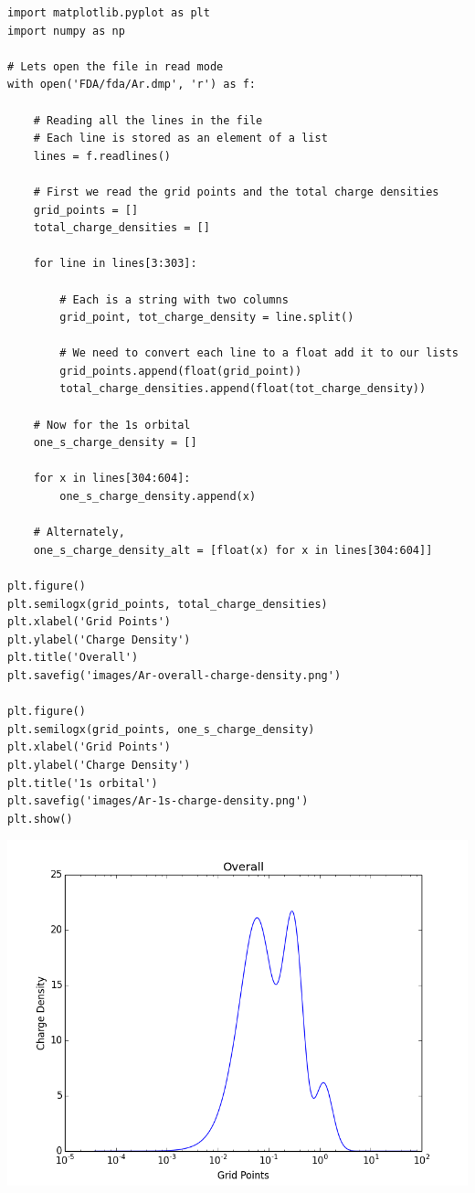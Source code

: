 \documentclass[11pt]{article}
\begin{document}
\begin{verbatim}
import matplotlib.pyplot as plt
import numpy as np

# Lets open the file in read mode
with open('FDA/fda/Ar.dmp', 'r') as f:

    # Reading all the lines in the file
    # Each line is stored as an element of a list
    lines = f.readlines()

    # First we read the grid points and the total charge densities
    grid_points = []
    total_charge_densities = []

    for line in lines[3:303]:

        # Each is a string with two columns
        grid_point, tot_charge_density = line.split()

        # We need to convert each line to a float add it to our lists
        grid_points.append(float(grid_point))
        total_charge_densities.append(float(tot_charge_density))
    
    # Now for the 1s orbital
    one_s_charge_density = []
    
    for x in lines[304:604]:
        one_s_charge_density.append(x)
 
    # Alternately,
    one_s_charge_density_alt = [float(x) for x in lines[304:604]]

plt.figure()
plt.semilogx(grid_points, total_charge_densities)
plt.xlabel('Grid Points')
plt.ylabel('Charge Density')
plt.title('Overall')
plt.savefig('images/Ar-overall-charge-density.png')

plt.figure()
plt.semilogx(grid_points, one_s_charge_density)
plt.xlabel('Grid Points')
plt.ylabel('Charge Density')
plt.title('1s orbital')
plt.savefig('images/Ar-1s-charge-density.png')
plt.show()
\end{verbatim}

\includegraphics[width=.9\linewidth]{./images/Ar-overall-charge-density.png}
\end{document}
